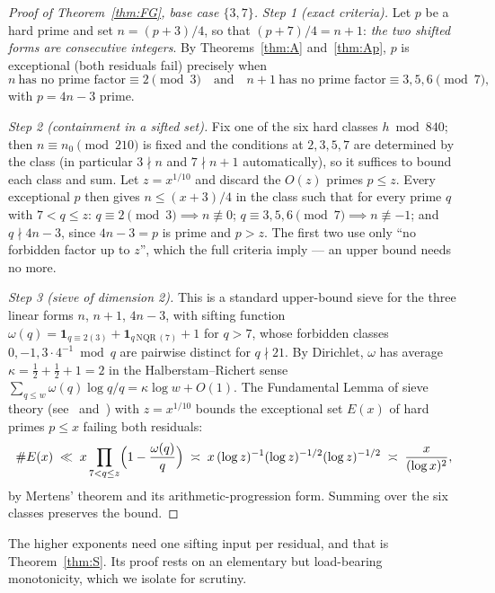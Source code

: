 \documentclass[11pt]{article}
\theoremstyle{plain}
\theoremstyle{remark}
\theoremstyle{plain}
\numberwithin{equation}{section}
\begin{document}
\begin{proof}[Proof of Theorem~\ref{thm:FG}, base case $\{3,7\}$]
\emph{Step 1 (exact criteria).} Let $p$ be a hard prime and set
$n = (p+3)/4$, so that $(p+7)/4 = n + 1$: \emph{the two shifted forms are
consecutive integers}. By Theorems~\ref{thm:A} and~\ref{thm:Ap}, $p$ is
exceptional (both residuals fail) precisely when
\[
  n \ \text{has no prime factor} \equiv 2 \pmod 3
  \quad\text{and}\quad
  n + 1 \ \text{has no prime factor} \equiv 3, 5, 6 \pmod 7,
\]
with $p = 4n - 3$ prime.

\emph{Step 2 (containment in a sifted set).} Fix one of the six hard
classes $h \bmod 840$; then $n \equiv n_0 \pmod{210}$ is fixed and the
conditions at $2, 3, 5, 7$ are determined by the class (in particular
$3 \nmid n$ and $7 \nmid n+1$ automatically), so it suffices to bound
each class and sum. Let $z = x^{1/10}$ and discard the $O(z)$ primes
$p \le z$. Every exceptional $p$ then gives $n \le (x+3)/4$ in the
class such that for every prime $q$ with $7 < q \le z$:
$q \equiv 2 \pmod 3 \implies n \not\equiv 0$;
$q \equiv 3, 5, 6 \pmod 7 \implies n \not\equiv -1$; and
$q \nmid 4n - 3$, since $4n-3 = p$ is prime and $p > z$. The first two
use only ``no forbidden factor up to $z$'', which the full criteria
imply --- an upper bound needs no more.

\emph{Step 3 (sieve of dimension 2).} This is a standard upper-bound
sieve for the three linear forms $n$, $n+1$, $4n - 3$, with sifting
function
$\omega(q) = \mathbf{1}_{q \equiv 2 (3)}
  + \mathbf{1}_{q \,\mathrm{NQR}\, (7)} + 1$ for $q > 7$,
whose forbidden classes $0, -1, 3 \cdot 4^{-1} \bmod q$ are pairwise
distinct for $q \nmid 21$. By Dirichlet, $\omega$ has average $\kappa =
\tfrac12 + \tfrac12 + 1 = 2$ in the Halberstam--Richert sense
$\sum_{q \le w} \omega(q) \log q / q = \kappa \log w + O(1)$. The
Fundamental Lemma of sieve theory (see~\cite[Thm.~2.5]{HalberstamRichert}
and~\cite[Ch.~6]{FriedlanderIwaniec}) with $z = x^{1/10}$ bounds
the exceptional set $E(x)$ of hard primes $p \le x$ failing both
residuals:
\[
  \#E(x) \;\ll\; x \prod_{7 < q \le z} \Bigl(1 - \frac{\omega(q)}{q}\Bigr)
  \;\asymp\; x \,(\log z)^{-1} (\log z)^{-1/2} (\log z)^{-1/2}
  \;\asymp\; \frac{x}{(\log x)^2},
\]
by Mertens' theorem and its arithmetic-progression form. Summing over the
six classes preserves the bound.
\end{proof}

The higher exponents need one sifting input per residual, and that is
Theorem~\ref{thm:S}. Its proof rests on an elementary but load-bearing
monotonicity, which we isolate for scrutiny.
\end{document}
